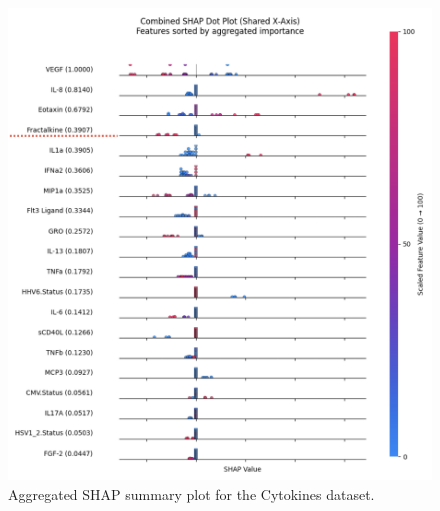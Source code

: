 \documentclass[12pt,a4paper]{report}
\begin{document}
\begin{figure}[h!]
    \centering
    \includegraphics[width=0.9\linewidth]{images/Aggregated_SHAP_cytokines_uncompressed.png}
    \caption[Aggregated SHAP plot for Cytokines]{Aggregated SHAP summary plot for the Cytokines dataset.}
    \label{fig:cytokines_aggregated_shap}
\end{figure}
\end{document}

